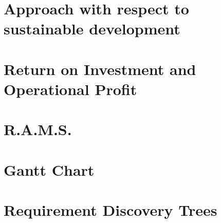 \documentclass[11pt]{report}
\begin{document}
\chapter{Approach with respect to sustainable development}
\label{blSustainable}

%
%

\chapter{Return on Investment and Operational Profit}
\label{blInvestment}

%
%

\chapter{R.A.M.S.}
\label{blRAMS}

%
%




%
%

\appendix
\chapter{Gantt Chart}
\label{ganttchart}
\chapter{Requirement Discovery Trees}
\label{reqdisctree}
\end{document}
